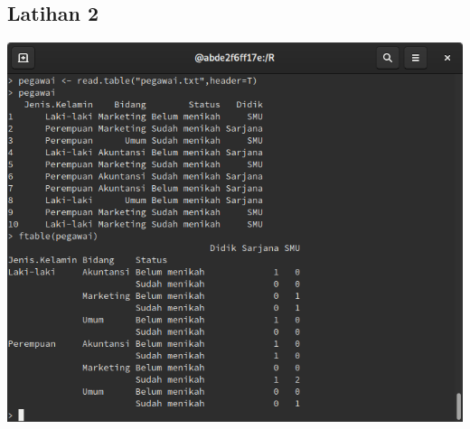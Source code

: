 \documentclass[a4paper,12pt]{article}
\begin{document}
\subsection{Latihan 2}
\includegraphics[width=\linewidth]{6}
\end{document}
